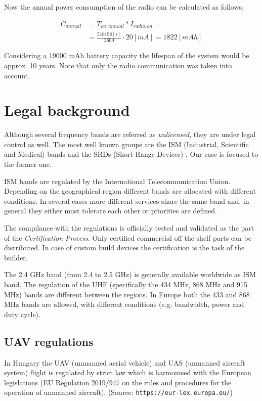 \documentclass[conference]{IEEEtran}
\begin{document}
Now the annual power consumption of the radio can be calculated as
follows:

\begin{align}
    C_{annual} &= T_{on,annual} * I_{radio,on} = \\
     &= \frac{510198 [s]}{3600} \cdot 20 [mA] = 1822 [mAh]
\end{align}

Considering a 19000 mAh battery capacity the lifespan of the system would
be approx. 10 years. Note that only the radio communication was taken into account.

\section{Legal background}

Although several frequency bands are referred as \emph{unlicensed}, they are
under legal control as well. The most well known groups are the ISM (Industrial,
Scientific and Medical) bands and the SRDs (Short Range Devices) \cite{loy2005}. Our case
is focused to the former one.

ISM bands are regulated by the International Telecommunication Union. Depending
on the geographical region different bands are allocated with different conditions.
In several cases more different services share the same band and, in general
they either must tolerate each other or priorities are defined.

The compilance with the regulations is officially tested and validated as the
part of the \emph{Certification Process}. Only certified commercial off the
shelf parts can be distributed. In case of custom build devices the certification
is the task of the builder.

The 2.4 GHz band (from 2.4 to 2.5 GHz) is generally available worldwide as
ISM band. The regulation of the UHF (specifically the 434 MHz, 868 MHz and 915 MHz)
bands are different between the regions. In Europe both the 433 and 868 MHz bands
are allowed, with different conditions (e.g. bandwidth, power and duty cycle).

\subsection{UAV regulations}

In Hungary the UAV (unmanned aerial vehicle) and UAS (unmanned aircraft system)
flight is regulated by strict law which is harmonised with the European
legislations (EU Regulation 2019/947 on the rules and procedures for the
operation of unmanned aircraft). (Source: \texttt{https://eur-lex.europa.eu/})
\end{document}
